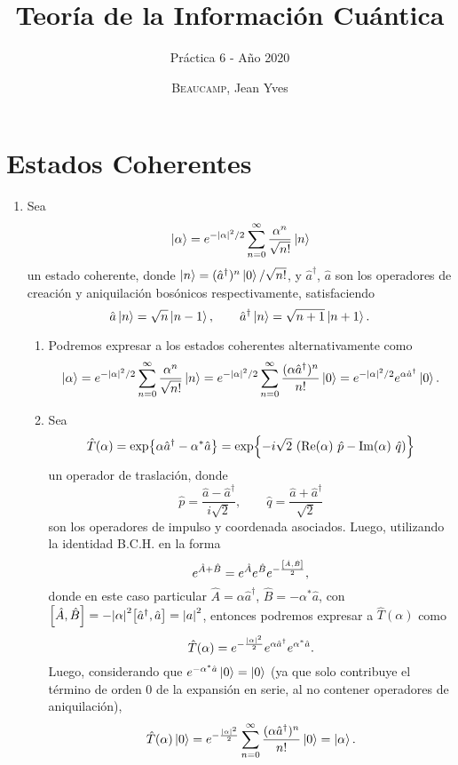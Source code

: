 \documentclass{scrartcl}
\title{Teoría de la Información Cuántica}
\subtitle{Práctica 6 - Año 2020}
\author{\textsc{Beaucamp}, Jean Yves}
\date{}
\renewcommand{\a}{\hat{a}}
\DeclareRobustCommand{\[}{\begin{equation}}
\DeclareRobustCommand{\]}{\end{equation}}
\begin{document}
\maketitle

\section{Estados Coherentes}
\begin{enumerate}
    
    \item Sea
    \[ \ket{\alpha} = e^{-\abs{\alpha}^2 / 2} \sum_{n = 0}^\infty \frac{\alpha^n}{\sqrt{n!}} \ket{n} \]
    un estado coherente, donde $\ket{n} = (\a^\dagger)^n \ket{0} / \sqrt{n!}$, y $\a^\dagger$, $\a$ son los operadores de creación y aniquilación bosónicos respectivamente, satisfaciendo
    \[ \a \ket{n} = \sqrt{n} \ket{n - 1}, \quad \quad \a^\dagger \ket{n} = \sqrt{n + 1} \ket{n + 1}. \]
    
    \begin{enumerate}
        \item Podremos expresar a los estados coherentes alternativamente como
        \[ \ket{\alpha} = e^{-\abs{\alpha}^2 / 2} \sum_{n = 0}^\infty \frac{\alpha^n}{\sqrt{n!}} \ket{n} = e^{-\abs{\alpha}^2 / 2} \sum_{n = 0}^\infty \frac{(\alpha \a^\dagger)^n}{n!} \ket{0} = e^{-\abs{\alpha}^2 / 2} e^{\alpha \a^\dagger} \ket{0}. \]
        
        
        \item Sea
        \[ \hat T(\alpha) = \exp{ \alpha \a^\dagger - \alpha^* \a } = \exp{ -i\sqrt{2} \ \qty(\Re(\alpha) \ \hat{p} - \Im(\alpha) \ \hat{q})} \]
        un operador de traslación, donde
        \[ \hat{p} = \frac{\a - \a^\dagger}{i \sqrt{2}}, \quad \quad \hat{q} = \frac{\a + \a^\dagger}{\sqrt{2}} \]
        son los operadores de impulso y coordenada asociados. Luego, utilizando la identidad B.C.H. en la forma
        \[ e^{\hat A + \hat B} = e^{\hat A} e^{\hat B} e^{- \frac{\comm{\hat A}{\hat B}}{2}}, \]
        donde en este caso particular $\hat A = \alpha \a^\dagger$, $\hat B = -\alpha^* \a$, con $\comm{\hat A}{\hat B} = -\abs{\alpha}^2 \comm{\a^\dagger}{\a} = \abs{a}^2$, entonces podremos expresar a $\hat T(\alpha)$ como
        \[ \hat T(\alpha) = e^{-\frac{\abs{\alpha}^2}{2}} e^{\alpha \a^\dagger} e^{\alpha^* \a}. \]
        Luego, considerando que $e^{-\alpha^* \a} \ket{0} = \ket{0}$ (ya que solo contribuye el término de orden 0 de la expansión en serie, al no contener operadores de aniquilación),
        \[ \hat T(\alpha) \ket{0} = e^{-\frac{\abs{\alpha}^2}{2}} \sum_{n = 0}^\infty \frac{(\alpha \a^\dagger)^n}{n!} \ket{0} = \ket{\alpha}. \]
        

\end{enumerate}
\end{enumerate}
\end{document}
